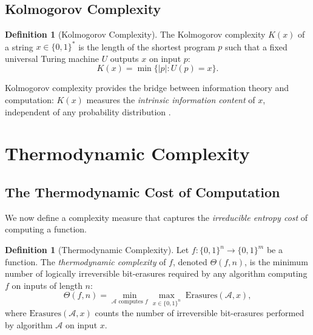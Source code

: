 \documentclass[12pt, a4paper]{article}
\theoremstyle{plain}
\theoremstyle{definition}
\newtheorem{definition}[theorem]{Definition}
\theoremstyle{remark}
\begin{document}
\subsection{Kolmogorov Complexity}

\begin{definition}[Kolmogorov Complexity]\label{def:kolmogorov}
  The Kolmogorov complexity $K(x)$ of a string $x \in \{0,1\}^*$ is the
  length of the shortest program $p$ such that a fixed universal Turing
  machine $U$ outputs $x$ on input $p$:
  \begin{equation}
    K(x) = \min\{|p| : U(p) = x\}.
  \end{equation}
\end{definition}

Kolmogorov complexity provides the bridge between information theory and
computation: $K(x)$ measures the \emph{intrinsic information content} of $x$,
independent of any probability distribution \citep{Kolmogorov1965, LiVitanyi2008}.

\section{Thermodynamic Complexity}\label{sec:thermo}

\subsection{The Thermodynamic Cost of Computation}

We now define a complexity measure that captures the \emph{irreducible
entropy cost} of computing a function.

\begin{definition}[Thermodynamic Complexity]\label{def:theta}
  Let $f: \{0,1\}^n \to \{0,1\}^m$ be a function. The \emph{thermodynamic
  complexity} of $f$, denoted $\Theta(f, n)$, is the minimum number of
  logically irreversible bit-erasures required by any algorithm computing
  $f$ on inputs of length $n$:
  \begin{equation}\label{eq:theta}
    \Theta(f, n) = \min_{\mathcal{A} \text{ computes } f}
    \max_{x \in \{0,1\}^n} \; \text{Erasures}(\mathcal{A}, x),
  \end{equation}
  where $\text{Erasures}(\mathcal{A}, x)$ counts the number of
  irreversible bit-erasures performed by algorithm $\mathcal{A}$ on
  input $x$.
\end{definition}
\end{document}
